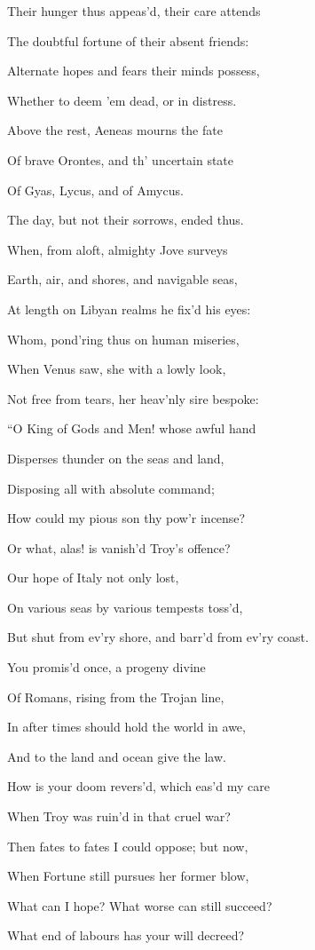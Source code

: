 Their hunger thus appeas’d, their care attends

The doubtful fortune of their absent friends:

Alternate hopes and fears their minds possess,

Whether to deem ’em dead, or in distress.

Above the rest, Aeneas mourns the fate

Of brave Orontes, and th’ uncertain state

Of Gyas, Lycus, and of Amycus.

The day, but not their sorrows, ended thus.

When, from aloft, almighty Jove surveys

Earth, air, and shores, and navigable seas,

At length on Libyan realms he fix’d his eyes:

Whom, pond’ring thus on human miseries,

When Venus saw, she with a lowly look,

Not free from tears, her heav’nly sire bespoke:

“O King of Gods and Men! whose awful hand

Disperses thunder on the seas and land,

Disposing all with absolute command;

How could my pious son thy pow’r incense?

Or what, alas! is vanish’d Troy’s offence?

Our hope of Italy not only lost,

On various seas by various tempests toss’d,

But shut from ev’ry shore, and barr’d from ev’ry coast.

You promis’d once, a progeny divine

Of Romans, rising from the Trojan line,

In after times should hold the world in awe,

And to the land and ocean give the law.

How is your doom revers’d, which eas’d my care

When Troy was ruin’d in that cruel war?

Then fates to fates I could oppose; but now,

When Fortune still pursues her former blow,

What can I hope? What worse can still succeed?

What end of labours has your will decreed?

